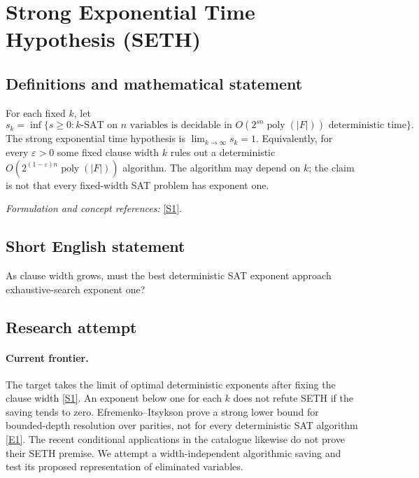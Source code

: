 \documentclass[11pt,a4paper]{article}
\newcommand{\sref}[2]{\hyperlink{source:#1:#2}{[S#2]}}
\newcommand{\eref}[2]{\hyperlink{extra:#1:#2}{[E#2]}}
\newif\ifshowcatalogue
\newcommand{\cataloguescope}[1]{\ifshowcatalogue
 \paragraph{Exact scope in the supplied catalogue.}
 \begin{quote}\small #1\end{quote}\fi}
\numberwithin{equation}{section}
\begin{document}
\setcounter{section}{0}
\clearpage
\section*{\texorpdfstring{Strong Exponential Time Hypothesis (SETH)}{Strong Exponential Time Hypothesis (SETH)}}\label{30006704}
\subsection{Definitions and mathematical statement}
For each fixed $k$, let
\[
 s_k=\inf\{s\ge0:k\text{-SAT on }n\text{ variables is decidable in }
 O(2^{sn}\operatorname{poly}(|F|))\text{ deterministic time}\}.
\]
The strong exponential time hypothesis is $\lim_{k\to\infty}s_k=1$. Equivalently, for every $\varepsilon>0$ some fixed clause width $k$ rules out a deterministic $O(2^{(1-\varepsilon)n}\operatorname{poly}(|F|))$ algorithm. The algorithm may depend on $k$; the claim is not that every fixed-width SAT problem has exponent one.
\par\smallskip\textit{Formulation and concept references:} \sref{30006704}{1}.
\cataloguescope{Prove or disprove that the optimal exponent s\_k for k-SAT satisfies lim\_\{k to infinity\} s\_k = 1.}
\subsection{Short English statement}
As clause width grows, must the best deterministic SAT exponent approach exhaustive-search exponent one?
\subsection{Research attempt}

\paragraph{Current frontier.}
The target takes the limit of optimal deterministic exponents after fixing the clause width \sref{30006704}{1}. An exponent below one for each $k$ does not refute SETH if the saving tends to zero. Efremenko--Itsykson prove a strong lower bound for bounded-depth resolution over parities, not for every deterministic SAT algorithm \eref{30006704}{1}. The recent conditional applications in the catalogue likewise do not prove their SETH premise. We attempt a width-independent algorithmic saving and test its proposed representation of eliminated variables.
\end{document}
